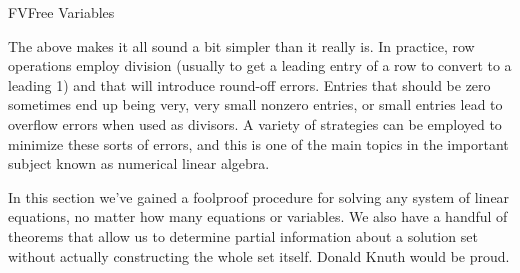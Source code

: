 \begin{subsect}{FV}{Free Variables}
\begin{para}
\end{para}
%
\begin{para}The above makes it all sound a bit simpler than it really is.  In practice, row operations employ division (usually to get a leading entry of a row to convert to a leading 1) and that will introduce round-off errors.  Entries that should be zero sometimes end up being very, very small nonzero entries, or small entries lead to overflow errors when used as divisors.  A variety of strategies can be employed to minimize these sorts of errors, and this is one of the main topics in the important subject known as numerical linear algebra.\end{para}
%
\begin{para}In this section we've gained a foolproof procedure for solving any system of linear equations, no matter how many equations or variables.  We also have a handful of theorems that allow us to determine partial information about a solution set without actually constructing the whole set itself.  Donald Knuth would be proud.\end{para}
%
%
\end{subsect}
%


